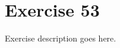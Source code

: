 \section{Exercise 53}
\begin{question}
   Exercise description goes here. 
\end{question}

\begin{solution}
\end{solution}
